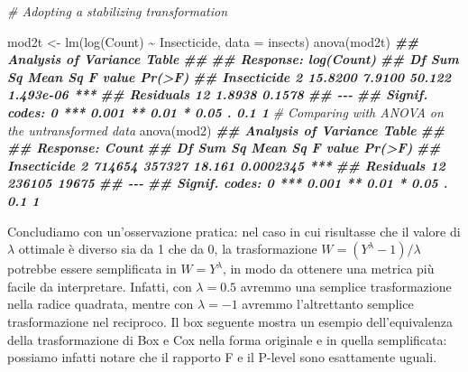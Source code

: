 \documentclass[
  12pt,
]{book}
\newenvironment{Shaded}{\begin{snugshade}}{\end{snugshade}}
\newcommand{\AttributeTok}[1]{\textcolor[rgb]{0.77,0.63,0.00}{#1}}
\newcommand{\CommentTok}[1]{\textcolor[rgb]{0.56,0.35,0.01}{\textit{#1}}}
\newcommand{\DocumentationTok}[1]{\textcolor[rgb]{0.56,0.35,0.01}{\textbf{\textit{#1}}}}
\newcommand{\FunctionTok}[1]{\textcolor[rgb]{0.00,0.00,0.00}{#1}}
\newcommand{\NormalTok}[1]{#1}
\newcommand{\OtherTok}[1]{\textcolor[rgb]{0.56,0.35,0.01}{#1}}
\newcommand{\SpecialCharTok}[1]{\textcolor[rgb]{0.00,0.00,0.00}{#1}}
\begin{document}
\begin{Shaded}
\begin{Highlighting}[]
\CommentTok{\# Adopting a stabilizing transformation}

\NormalTok{mod2t }\OtherTok{\textless{}{-}} \FunctionTok{lm}\NormalTok{(}\FunctionTok{log}\NormalTok{(Count) }\SpecialCharTok{\textasciitilde{}}\NormalTok{ Insecticide, }\AttributeTok{data =}\NormalTok{ insects)}
\FunctionTok{anova}\NormalTok{(mod2t)}
\DocumentationTok{\#\# Analysis of Variance Table}
\DocumentationTok{\#\# }
\DocumentationTok{\#\# Response: log(Count)}
\DocumentationTok{\#\#             Df  Sum Sq Mean Sq F value    Pr(\textgreater{}F)    }
\DocumentationTok{\#\# Insecticide  2 15.8200  7.9100  50.122 1.493e{-}06 ***}
\DocumentationTok{\#\# Residuals   12  1.8938  0.1578                      }
\DocumentationTok{\#\# {-}{-}{-}}
\DocumentationTok{\#\# Signif. codes:  0 \textquotesingle{}***\textquotesingle{} 0.001 \textquotesingle{}**\textquotesingle{} 0.01 \textquotesingle{}*\textquotesingle{} 0.05 \textquotesingle{}.\textquotesingle{} 0.1 \textquotesingle{} \textquotesingle{} 1}
\CommentTok{\# Comparing with ANOVA on the untransformed data}
\FunctionTok{anova}\NormalTok{(mod2)}
\DocumentationTok{\#\# Analysis of Variance Table}
\DocumentationTok{\#\# }
\DocumentationTok{\#\# Response: Count}
\DocumentationTok{\#\#             Df Sum Sq Mean Sq F value    Pr(\textgreater{}F)    }
\DocumentationTok{\#\# Insecticide  2 714654  357327  18.161 0.0002345 ***}
\DocumentationTok{\#\# Residuals   12 236105   19675                      }
\DocumentationTok{\#\# {-}{-}{-}}
\DocumentationTok{\#\# Signif. codes:  0 \textquotesingle{}***\textquotesingle{} 0.001 \textquotesingle{}**\textquotesingle{} 0.01 \textquotesingle{}*\textquotesingle{} 0.05 \textquotesingle{}.\textquotesingle{} 0.1 \textquotesingle{} \textquotesingle{} 1}
\end{Highlighting}
\end{Shaded}

Concludiamo con un'osservazione pratica: nel caso in cui risultasse che il valore di \(\lambda\) ottimale è diverso sia da 1 che da 0, la trasformazione \(W = (Y^\lambda - 1)/\lambda\) potrebbe essere semplificata in \(W = Y^\lambda\), in modo da ottenere una metrica più facile da interpretare. Infatti, con \(\lambda = 0.5\) avremmo una semplice trasformazione nella radice quadrata, mentre con \(\lambda = -1\) avremmo l'altrettanto semplice trasformazione nel reciproco. Il box seguente mostra un esempio dell'equivalenza della trasformazione di Box e Cox nella forma originale e in quella semplificata: possiamo infatti notare che il rapporto F e il P-level sono esattamente uguali.
\end{document}
